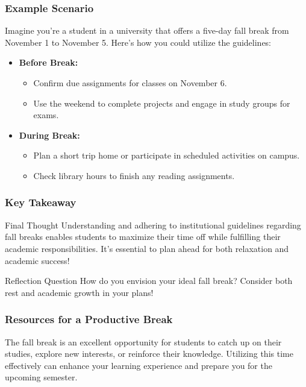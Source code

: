 \documentclass[aspectratio=169]{beamer}
\begin{document}
\begin{frame}[fragile]
    \frametitle{Example Scenario}

    Imagine you're a student in a university that offers a five-day fall break from November 1 to November 5. Here’s how you could utilize the guidelines:
    \begin{itemize}
        \item \textbf{Before Break:}
        \begin{itemize}
            \item Confirm due assignments for classes on November 6.
            \item Use the weekend to complete projects and engage in study groups for exams.
        \end{itemize}
        \item \textbf{During Break:}
        \begin{itemize}
            \item Plan a short trip home or participate in scheduled activities on campus.
            \item Check library hours to finish any reading assignments.
        \end{itemize}
    \end{itemize}
\end{frame}

\begin{frame}[fragile]
    \frametitle{Key Takeaway}

    \begin{block}{Final Thought}
        Understanding and adhering to institutional guidelines regarding fall breaks enables students to maximize their time off while fulfilling their academic responsibilities. 
        It’s essential to plan ahead for both relaxation and academic success!
    \end{block}

    \begin{block}{Reflection Question}
        How do you envision your ideal fall break? Consider both rest and academic growth in your plans!
    \end{block}
\end{frame}

\begin{frame}[fragile]
    \frametitle{Resources for a Productive Break}
    The fall break is an excellent opportunity for students to catch up on their studies, explore new interests, or reinforce their knowledge. Utilizing this time effectively can enhance your learning experience and prepare you for the upcoming semester.
\end{frame}
\end{document}
